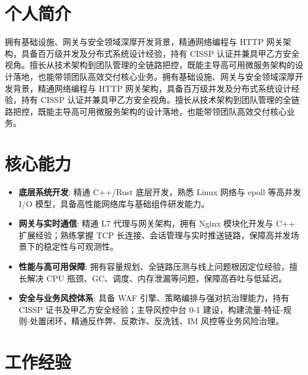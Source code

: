 


\section{个人简介}

\sloppy
拥有基础设施、网关与安全领域深厚开发背景，精通网络编程与 HTTP 网关架构，具备百万级并发及分布式系统设计经验，持有 CISSP 认证并兼具甲乙方安全视角。擅长从技术架构到团队管理的全链路把控，既能主导高可用微服务架构的设计落地，也能带领团队高效交付核心业务。拥有基础设施、网关与安全领域深厚开发背景，精通网络编程与 HTTP 网关架构，具备百万级并发及分布式系统设计经验，持有 CISSP 认证并兼具甲乙方安全视角。擅长从技术架构到团队管理的全链路把控，既能主导高可用微服务架构的设计落地，也能带领团队高效交付核心业务。

\vspace{0.2cm}

\section{核心能力}
\begin{itemize}[parsep=0.2ex]
  \item \textbf{底层系统开发}: 精通 C++/Rust 底层开发，熟悉 Linux 网络与 epoll 等高并发 I/O 模型，具备高性能网络库与基础组件研发能力。
  \item \textbf{网关与实时通信}: 精通 L7 代理与网关架构，拥有 Nginx 模块化开发与 C++ 扩展经验；熟练掌握 TCP 长连接、会话管理与实时推送链路，保障高并发场景下的稳定性与可观测性。
  \item \textbf{性能与高可用保障}: 拥有容量规划、全链路压测与线上问题根因定位经验，擅长解决 CPU 瓶颈、GC、调度、内存泄漏等问题，保障高吞吐与低延迟。
  \item \textbf{安全与业务风控体系}: 具备 WAF 引擎、策略编排与强对抗治理能力，持有 CISSP 证书及甲乙方安全经验；主导风控中台 0-1 建设，构建流量‑特征‑规则‑处置闭环，精通反作弊、反欺诈、反洗钱、IM 风控等业务风险治理。
\end{itemize}

\vspace{0.2cm}

\section{工作经验}
\vspace{0.2cm}

